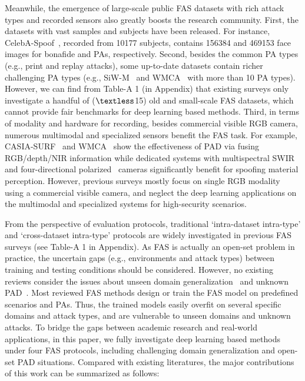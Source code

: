 \documentclass[10pt,journal,compsoc]{IEEEtran}
\begin{document}
Meanwhile, the emergence of large-scale public FAS datasets with rich attack types and recorded sensors also greatly boosts the research community. First, the datasets with vast samples and subjects have been released. For instance, CelebA-Spoof~\cite{zhang2020celeba}, recorded from 10177 subjects, contains 156384 and 469153 face images for bonafide and PAs, respectively. Second, besides the common PA types (e.g., print and replay attacks), some up-to-date datasets contain richer challenging PA types (e.g., SiW-M~\cite{liu2019deep} and WMCA~\cite{george2019biometric} with more than 10 PA types). However, we can find from Table-A 1 (in Appendix) that existing surveys only investigate a handful of ($\textless$15) old and small-scale FAS datasets, which cannot provide fair benchmarks for deep learning based methods. Third, in terms of modality and hardware for recording, besides commercial visible RGB camera, numerous multimodal and specialized sensors benefit the FAS task. For example, CASIA-SURF~\cite{zhang2020casia} and WMCA~\cite{george2019biometric} show the effectiveness of PAD via fusing RGB/depth/NIR information while dedicated systems with multispectral SWIR~\cite{steiner2016reliable} and four-directional polarized~\cite{tian2020face} cameras significantly benefit for spoofing material perception. However, previous surveys mostly focus on single RGB modality using a commercial visible camera, and neglect the deep learning applications on the multimodal and specialized systems for high-security scenarios.





From the perspective of evaluation protocols, traditional `intra-dataset intra-type' and `cross-dataset intra-type' protocols are widely investigated in previous FAS surveys (see Table-A 1 in Appendix). As FAS is actually an open-set problem in practice, the uncertain gaps (e.g., environments and attack types) between training and testing conditions should be considered. However, no existing reviews consider the issues about unseen domain generalization~\cite{shao2019multi,shao2019regularized,wang2020cross,jia2020single} and unknown PAD~\cite{arashloo2017anomaly,liu2019deep,qin2019learning,qin2020one}. Most reviewed FAS methods design or train the FAS model on predefined scenarios and PAs. Thus, the trained models easily overfit on several specific domains and attack types, and are vulnerable to unseen domains and unknown attacks. To bridge the gaps between academic research and real-world applications, in this paper, we fully investigate deep learning based methods under four FAS protocols, including challenging domain generalization and open-set PAD situations. 
Compared with existing literatures, the major contributions of this work can be summarized as follows: 
\end{document}
